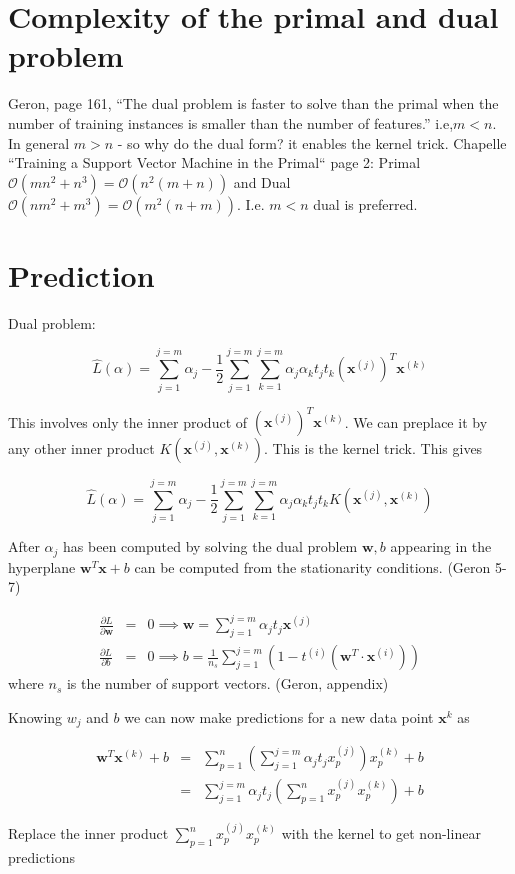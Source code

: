 \documentclass{article}
\newcommand{\beq}{\begin{equation}}
\newcommand{\eeq}{\end{equation}}
\newcommand{\ber}{\begin{eqnarray}}
\newcommand{\eer}{\end{eqnarray}}
\newcommand{\pdd}[2]{\frac{\partial{#1}}{\partial{#2}}}
\begin{document}
\section{Complexity of the primal and dual problem}
Geron, page 161, ``The dual problem is faster to solve than the primal when the number of training instances is smaller than the number of features.'' i.e,$m<n$. In general $m>n$ - so why do the dual form? it enables the kernel trick.
Chapelle ``Training a Support Vector Machine in the Primal`` page 2: Primal $\mathcal{O}(mn^2 + n^3)=\mathcal{O}(n^2(m+n))$ and Dual $\mathcal{O}(nm^2+m^3)=\mathcal{O}(m^2(n+m))$. I.e. $m<n$ dual is preferred.  


\section{Prediction}

Dual problem:

\beq
\hat{L}(\alpha) = \sum_{j=1}^{j=m}\alpha_j - \frac{1}{2}\sum_{j=1}^{j=m}\sum_{k=1}^{j=m}\alpha_j\alpha_kt_jt_k(\pmb{x}^{(j)})^T\pmb{x}^{(k)}
\eeq

This involves only the inner product of $(\pmb{x}^{(j)})^T\pmb{x}^{(k)}$. We can preplace it by any other inner product $K(\pmb{x}^{(j)},\pmb{x}^{(k)})$. This is the kernel trick. This gives

\beq
\hat{L}(\alpha) = \sum_{j=1}^{j=m}\alpha_j - \frac{1}{2}\sum_{j=1}^{j=m}\sum_{k=1}^{j=m}\alpha_j\alpha_kt_jt_kK(\pmb{x}^{(j)},\pmb{x}^{(k)})
\eeq

After $\alpha_j$ has been computed by solving the dual problem $\pmb{w},b$ appearing in the hyperplane $\pmb{w}^{T}\pmb{x} + b$ can be computed from the stationarity conditions.
(Geron 5-7)

\ber
\pdd{L}{\pmb{w}} &=& 0 \implies \pmb{w} = \sum_{j=1}^{j=m} \alpha_j t_j \pmb{x}^{(j)} \\
\pdd{L}{b}  &=& 0 \implies b = \frac{1}{n_s}\sum_{j=1}^{j=m} (1-t^{(i)}(\pmb{w}^T\cdot\pmb{x}^{(i)}))
\eer
where $n_s$ is the number of support vectors. (Geron, appendix)

Knowing $w_j$ and $b$ we can now make predictions for a new data point $\pmb{x}^{k}$ as 

\ber
\pmb{w}^T{\pmb{x}^{(k)}} + b &=& \sum_{p=1}^{n}(\sum_{j=1}^{j=m} \alpha_j t_j x_p^{(j)})x^{(k)}_{p} + b \\
&=& \sum_{j=1}^{j=m}  \alpha_j t_j ( \sum_{p=1}^{n}x_p^{(j)}x^{(k)}_{p}) + b
\eer

Replace the inner product $\sum_{p=1}^{n}x_p^{(j)}x^{(k)}_{p}$ with the kernel to get non-linear predictions
\end{document}
